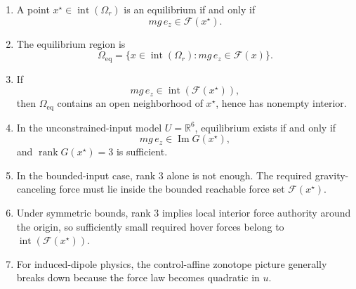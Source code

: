 \documentclass[11pt]{article}
\theoremstyle{definition}
\begin{document}
\begin{enumerate}[label=\textbf{(\arabic*)}, leftmargin=1.5em]
    \item A point \(x^\star \in \operatorname{int}(\Omega_r)\) is an equilibrium if and only if
    \[
    mg\,e_z \in \mathcal{F}(x^\star).
    \]

    \item The equilibrium region is
    \[
    \Omega_{\mathrm{eq}}
    =
    \{x \in \operatorname{int}(\Omega_r) : mg\,e_z \in \mathcal{F}(x)\}.
    \]

    \item If
    \[
    mg\,e_z \in \operatorname{int}(\mathcal{F}(x^\star)),
    \]
    then \(\Omega_{\mathrm{eq}}\) contains an open neighborhood of \(x^\star\), hence has nonempty interior.

    \item In the unconstrained-input model \(U=\mathbb{R}^6\), equilibrium exists if and only if
    \[
    mg\,e_z \in \operatorname{Im}G(x^\star),
    \]
    and \(\operatorname{rank}G(x^\star)=3\) is sufficient.

    \item In the bounded-input case, rank \(3\) alone is not enough. The required gravity-canceling force must lie inside the bounded reachable force set \(\mathcal{F}(x^\star)\).

    \item Under symmetric bounds, rank \(3\) implies local interior force authority around the origin, so sufficiently small required hover forces belong to \(\operatorname{int}(\mathcal{F}(x^\star))\).

    \item For induced-dipole physics, the control-affine zonotope picture generally breaks down because the force law becomes quadratic in \(u\).
\end{enumerate}
\end{document}
